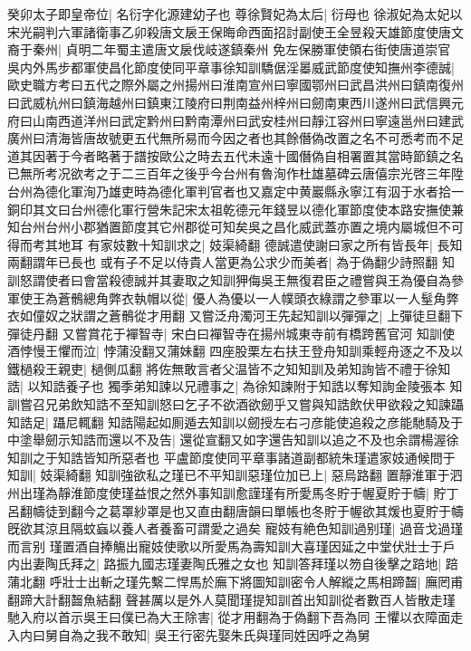 癸卯太子即皇帝位|{
	名衍字化源建幼子也}
尊徐賢妃為太后|{
	衍母也}
徐淑妃為太妃以宋光嗣判六軍諸衛事乙卯殺唐文扆王保晦命西面招討副使王全昱殺天雄節度使唐文裔于秦州|{
	貞明二年蜀主遣唐文扆伐岐遂鎮秦州}
免左保勝軍使領右街使唐道崇官　吳内外馬步都軍使昌化節度使同平章事徐知訓驕倨淫㬥威武節度使知撫州李德誠|{
	歐史職方考曰五代之際外屬之州揚州曰淮南宣州曰寧國鄂州曰武昌洪州曰鎮南復州曰武威杭州曰鎮海越州曰鎮東江陵府曰荆南益州梓州曰劒南東西川遂州曰武信興元府曰山南西道洋州曰武定黔州曰黔南潭州曰武安桂州曰靜江容州曰寧遠邕州曰建武廣州曰清海皆唐故號更五代無所易而今因之者也其餘僭偽改置之名不可悉考而不足道其因著于今者略著于譜按歐公之時去五代未遠十國僭偽自相署置其當時節鎮之名已無所考况欲考之于二三百年之後乎今台州有魯洵作杜雄墓碑云唐僖宗光啓三年陞台州為德化軍洵乃雄吏時為德化軍判官者也又嘉定中黄巖縣永寧江有泅于水者拾一銅印其文曰台州德化軍行營朱記宋太祖乾德元年錢昱以德化軍節度使本路安撫使兼知台州台州小郡猶置節度其它州郡從可知矣吳之昌化威武蓋亦置之境内屬城但不可得而考其地耳}
有家妓數十知訓求之|{
	妓渠綺翻}
德誠遣使謝曰家之所有皆長年|{
	長知兩翻謂年已長也}
或有子不足以侍貴人當更為公求少而美者|{
	為于偽翻少詩照翻}
知訓怒謂使者曰會當殺德誠并其妻取之知訓狎侮吳王無復君臣之禮嘗與王為優自為參軍使王為蒼鶻總角弊衣執帽以從|{
	優人為優以一人幞頭衣綠謂之參軍以一人髽角弊衣如僮奴之狀謂之蒼鶻從才用翻}
又嘗泛舟濁河王先起知訓以彈彈之|{
	上彈徒旦翻下彈徒丹翻}
又嘗賞花于襌智寺|{
	宋白曰襌智寺在揚州城東寺前有橋跨舊官河}
知訓使酒悖慢王懼而泣|{
	悖蒲没翻又蒲妹翻}
四座股栗左右扶王登舟知訓乘輕舟逐之不及以鐵檛殺王親吏|{
	檛側瓜翻}
將佐無敢言者父温皆不之知知訓及弟知詢皆不禮于徐知誥|{
	以知誥養子也}
獨季弟知諫以兄禮事之|{
	為徐知諫附于知誥以奪知詢金陵張本}
知訓嘗召兄弟飲知誥不至知訓怒曰乞子不欲酒欲劒乎又嘗與知誥飲伏甲欲殺之知諫躡知誥足|{
	躡尼輒翻}
知誥陽起如厠遁去知訓以劒授左右刁彦能使追殺之彦能馳騎及于中塗舉劒示知誥而還以不及告|{
	還從宣翻又如字還告知訓以追之不及也余謂楊渥徐知訓之于知誥皆知所惡者也}
平盧節度使同平章事諸道副都統朱瑾遣家妓通候問于知訓|{
	妓渠綺翻}
知訓強欲私之瑾已不平知訓惡瑾位加已上|{
	惡烏路翻}
置靜淮軍于泗州出瑾為靜淮節度使瑾益恨之然外事知訓愈謹瑾有所愛馬冬貯于幄夏貯于幬|{
	貯丁呂翻幬徒到翻今之葛罩紗罩是也又直由翻唐韻曰單帳也冬貯于幄欲其煖也夏貯于幬旣欲其涼且隔蚊蝱以養人者養畜可謂愛之過矣}
寵妓有絶色知訓過别瑾|{
	過音戈過瑾而言别}
瑾置酒自捧觴出寵妓使歌以所愛馬為壽知訓大喜瑾因延之中堂伏壯士于戶内出妻陶氏拜之|{
	路振九國志瑾妻陶氏雅之女也}
知訓答拜瑾以笏自後擊之踣地|{
	踣蒲北翻}
呼壯士出斬之瑾先繫二悍馬於廡下將圖知訓密令人解縱之馬相蹄齧|{
	廡罔甫翻蹄大計翻齧魚結翻}
聲甚厲以是外人莫聞瑾提知訓首出知訓從者數百人皆散走瑾馳入府以首示吳王曰僕已為大王除害|{
	從才用翻為于偽翻下吾為同}
王懼以衣障面走入内曰舅自為之我不敢知|{
	吳王行密先娶朱氏與瑾同姓因呼之為舅}

